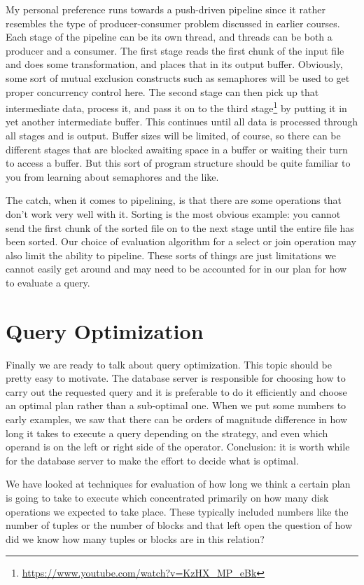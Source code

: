 \documentclass[a4paper]{report}
\begin{document}
My personal preference runs towards a push-driven pipeline since it rather resembles the type of producer-consumer problem discussed in earlier courses. Each stage of the pipeline can be its own thread, and threads can be both a producer and a consumer. The first stage reads the first chunk of the input file and does some transformation, and places that in its output buffer. Obviously, some sort of mutual exclusion constructs such as semaphores will be used to get proper concurrency control here. The second stage can then pick up that intermediate data, process it, and pass it on to the third stage\footnote{\url{https://www.youtube.com/watch?v=KzHX_MP_eBk}} by putting it in yet another intermediate buffer. This continues until all data is processed through all stages and is output. Buffer sizes will be limited, of course, so there can be different stages that are blocked awaiting space in a buffer or waiting their turn to access a buffer. But this sort of program structure should be quite familiar to you from learning about semaphores and the like.

The catch, when it comes to pipelining, is that there are some operations that don't work very well with it. Sorting is the most obvious example: you cannot send the first chunk of the sorted file on to the next stage until the entire file has been sorted. Our choice of evaluation algorithm for a select or join operation may also limit the ability to pipeline. These sorts of things are just limitations we cannot easily get around and may need to be accounted for in our plan for how to evaluate a query.

\section*{Query Optimization}

Finally we are ready to talk about query optimization. This topic should be pretty easy to motivate. The database server is responsible for choosing how to carry out the requested query and it is preferable to do it efficiently and choose an optimal plan rather than a sub-optimal one. When we put some numbers to early examples, we saw that there can be orders of magnitude difference in how long it takes to execute a query depending on the strategy, and even which operand is on the left or right side of the operator. Conclusion: it is worth while for the database server to make the effort to decide what is optimal.

We have looked at techniques for evaluation of how long we think a certain plan is going to take to execute which concentrated primarily on how many disk operations we expected to take place. These typically included numbers like the number of tuples or the number of blocks and that left open the question of how did we know how many tuples or blocks are in this relation?
\end{document}
